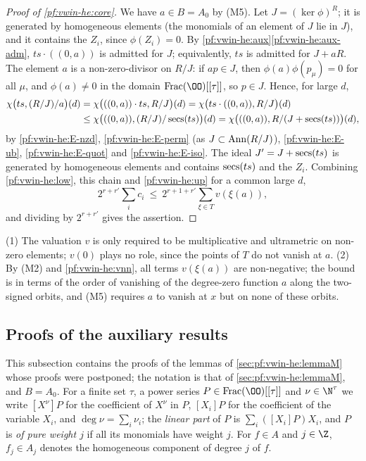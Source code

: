 \begin{proof}[Proof of \cref{pf:vwin-he:core}]
We have $a\in B=A_0$ by (M5). Let $J=(\ker\phi)^R$; it is generated by homogeneous elements (the monomials of an
element of $J$ lie in $J$), and it contains the $Z_i$, since $\phi(Z_i)=0$. By
\cref{pf:vwin-he:aux}\ref{pf:vwin-he:aux-adm}, $ts\cdot((0,a))$ is admitted for $J$; equivalently, $ts$ is admitted for
$J+aR$. The element $a$ is a non-zero-divisor on $R/J$: if $ap\in J$, then $\phi(a)\phi(p_\mu)=0$ for all $\mu$, and
$\phi(a)\ne0$ in the domain $\mathrm{Frac}(\OO)[[\tau]]$, so $p\in J$. Hence, for large $d$,
\begin{align*}
 \chi\bigl(ts,(R/J)/a\bigr)(d)&=\chi\bigl(((0,a))\cdot ts,R/J\bigr)(d)=\chi\bigl(ts\cdot((0,a)),R/J\bigr)(d)\\
 &\le\chi\bigl(((0,a)),(R/J)/\operatorname{secs}(ts)\bigr)(d)=\chi\bigl(((0,a)),R/(J+\operatorname{secs}(ts))\bigr)(d),
\end{align*}
by \ref{pf:vwin-he:E-nzd}, \ref{pf:vwin-he:E-perm} (as $J\subset\operatorname{Ann}(R/J)$), \ref{pf:vwin-he:E-ub},
\ref{pf:vwin-he:E-quot} and \ref{pf:vwin-he:E-iso}. The ideal $J'=J+\operatorname{secs}(ts)$ is generated by homogeneous
elements and contains $\operatorname{secs}(ts)$ and the $Z_i$. Combining \cref{pf:vwin-he:low}, this chain and
\cref{pf:vwin-he:up} for a common large $d$,
\[
 2^{r+r'}\sum_ic_i\ \le\ 2^{r+1+r'}\sum_{\xi\in T}v(\xi(a)),
\]
and dividing by $2^{r+r'}$ gives the assertion.
\end{proof}

\begin{remark}\label{pf:vwin-he:rem-M}
(1) The valuation $v$ is only required to be multiplicative and ultrametric on non-zero elements; $v(0)$ plays no
role, since the points of $T$ do not vanish at $a$.
(2) By (M2) and \cref{pf:vwin-he:vnn}, all terms $v(\xi(a))$ are non-negative; the bound is
in terms of the order of vanishing of the degree-zero function $a$ along the two-signed orbits, and (M5) requires
$a$ to vanish at $x$ but on none of these orbits.
\end{remark}

\subsection{Proofs of the auxiliary results}\label{sec:pf:vwin-he:auxproofs}

This subsection contains the proofs of the lemmas of \cref{sec:pf:vwin-he:lemmaM} whose proofs were postponed; the
notation is that of \cref{sec:pf:vwin-he:lemmaM}, and $B=A_0$. For a finite set $\tau$, a power series
$P\in\mathrm{Frac}(\OO)[[\tau]]$ and $\nu\in\N^\tau$ we write $[X^\nu]P$ for the coefficient of $X^\nu$ in $P$,
$[X_i]P$ for the coefficient of the variable $X_i$, and $\deg\nu=\sum_i\nu_i$; the \emph{linear part} of $P$ is
$\sum_i([X_i]P)X_i$, and $P$ is \emph{of pure weight $j$} if all its monomials have weight $j$. For $f\in A$ and
$j\in\Z$, $f_j\in A_j$ denotes the homogeneous component of degree $j$ of $f$.

